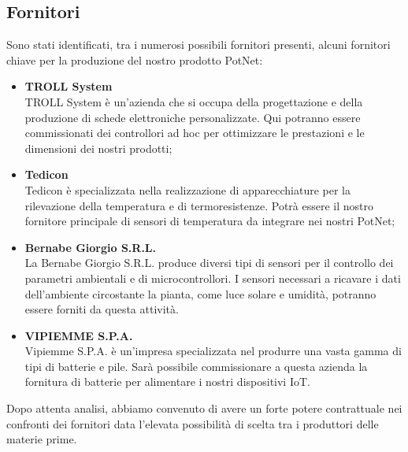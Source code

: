 \subsection{Fornitori}
Sono stati identificati, tra i numerosi possibili fornitori presenti, alcuni fornitori chiave per la produzione del nostro prodotto PotNet:
\begin{itemize}
	\item \textbf{TROLL System}\\
	TROLL System è un’azienda che si occupa della progettazione e della produzione di schede elettroniche personalizzate. Qui potranno essere commissionati dei controllori ad hoc per ottimizzare le prestazioni e le dimensioni dei nostri prodotti;
	
	\item \textbf{Tedicon}\\
	Tedicon è specializzata nella realizzazione di apparecchiature per la rilevazione della temperatura e di termoresistenze. Potrà essere il nostro fornitore principale di sensori di temperatura da integrare nei nostri PotNet;
	
	\item \textbf{Bernabe Giorgio S.R.L.}\\
	La Bernabe Giorgio S.R.L. produce diversi tipi di sensori per il controllo dei parametri ambientali e di microcontrollori. I sensori necessari a ricavare i dati dell’ambiente circostante la pianta, come luce solare e umidità, potranno essere forniti da questa attività.
	
	\item \textbf{VIPIEMME S.P.A.}\\
	Vipiemme S.P.A. è un’impresa specializzata nel produrre una vasta gamma di tipi di batterie e pile. Sarà possibile commissionare a questa azienda la fornitura di batterie per alimentare i nostri dispositivi IoT.
\end{itemize}
Dopo attenta analisi, abbiamo convenuto di avere un forte potere contrattuale nei confronti dei fornitori data l’elevata possibilità di scelta tra i produttori delle materie prime.
